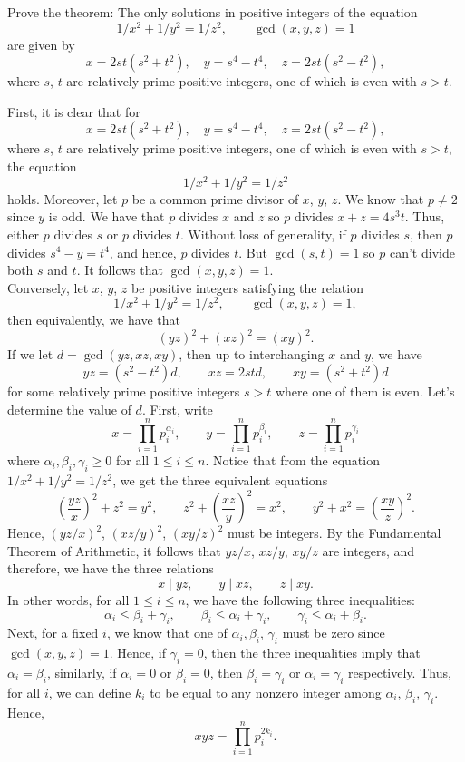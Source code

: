 \begin{exercise}
    Prove the theorem: The only solutions in positive integers of the equation
    $$1/x^2 + 1/y^2 = 1/z^2, \qquad \gcd(x,y,z) = 1$$
    are given by
    $$x = 2st(s^2 + t^2), \quad y = s^4- t^4, \quad z = 2st(s^2 - t^2),$$
    where $s$, $t$ are relatively prime positive integers, one of which is even with $s > t$. \\
\end{exercise}

\begin{solution}
    First, it is clear that for
    $$x = 2st(s^2 + t^2), \quad y = s^4- t^4, \quad z = 2st(s^2 - t^2),$$
    where $s$, $t$ are relatively prime positive integers, one of which is even with $s > t$, the equation
    $$1/x^2 + 1/y^2 = 1/z^2$$
    holds. Moreover, let $p$ be a common prime divisor of $x$, $y$, $z$. We know that $p \neq 2$ since $y$ is odd. We have that $p$ divides $x$ and $z$ so $p$ divides $x + z = 4s^3t$. Thus, either $p$ divides $s$ or $p$ divides $t$. Without loss of generality, if $p$ divides $s$, then $p$ divides $s^4 - y = t^4$, and hence, $p$ divides $t$. But $\gcd(s,t) = 1$ so $p$ can't divide both $s$ and $t$. It follows that $\gcd(x,y,z) = 1$. \\
    
    \noindent Conversely, let $x$, $y$, $z$ be positive integers satisfying the relation
    $$1/x^2 + 1/y^2 = 1/z^2, \qquad \gcd(x,y,z) = 1,$$
    then equivalently, we have that
    $$(yz)^2 + (xz)^2 = (xy)^2.$$
    If we let $d = \gcd(yz, xz, xy)$, then up to interchanging $x$ and $y$, we have
    $$yz = (s^2 - t^2)d, \qquad xz = 2std, \qquad xy = (s^2 + t^2)d$$
    for some relatively prime positive integers $s > t$ where one of them is even. Let's determine the value of $d$. First, write
    $$x = \prod_{i=1}^{n}p_i^{\alpha_i}, \qquad y = \prod_{i=1}^{n}p_i^{\beta_i}, \qquad z = \prod_{i=1}^{n}p_i^{\gamma_i}$$
    where $\alpha_i, \beta_i, \gamma_i \geq 0$ for all $1 \leq i \leq n$. Notice that from the equation $1/x^2 + 1/y^2 = 1/z^2$, we get the three equivalent equations
    $$\left(\frac{yz}{x}\right)^2 + z^2 = y^2, \qquad z^2 + \left(\frac{xz}{y}\right)^2 = x^2, \qquad y^2 + x^2 = \left(\frac{xy}{z}\right)^2.$$
    Hence, $(yz/x)^2$, $(xz/y)^2$, $(xy/z)^2$ must be integers. By the Fundamental Theorem of Arithmetic, it follows that $yz/x$, $xz/y$, $xy/z$ are integers, and therefore, we have the three relations
    $$x \mid yz, \qquad y \mid xz, \qquad z \mid xy.$$
    In other words, for all $1 \leq i \leq n$, we have the following three inequalities: 
    $$\alpha_i \leq \beta_i + \gamma_i, \qquad \beta_i \leq \alpha_i + \gamma_i, \qquad \gamma_i \leq \alpha_i + \beta_i.$$
    Next, for a fixed $i$, we know that one of $\alpha_i, \beta_i$, $\gamma_i$ must be zero since $\gcd(x,y,z) = 1$. Hence, if $\gamma_i = 0$, then the three inequalities imply that $\alpha_i = \beta_i$, similarly, if $\alpha_i = 0$ or $\beta_i = 0$, then $\beta_i = \gamma_i$ or $\alpha_i = \gamma_i$ respectively. Thus, for all $i$, we can define $k_i$ to be equal to any nonzero integer among $\alpha_i$, $\beta_i$, $\gamma_i$. Hence,
    $$xyz = \prod_{i=1}^{n}p_i^{2k_i}.$$
    

\end{solution}

